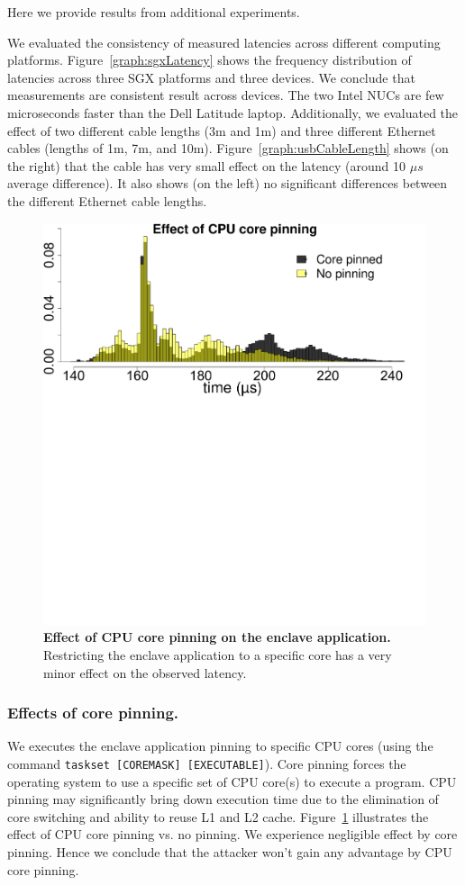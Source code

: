 Here we provide results from additional experiments.

We evaluated the consistency of measured latencies across different computing platforms. Figure~\ref{graph:sgxLatency} shows the frequency distribution of latencies across three SGX platforms and three \device devices. We conclude that measurements are consistent result across devices. The two Intel NUCs are few microseconds faster than the Dell Latitude laptop. Additionally, we evaluated the effect of two different \usb cable lengths (3m and 1m) and three different Ethernet cables (lengths of 1m, 7m, and 10m). Figure~\ref{graph:usbCableLength} shows (on the right) that the \usb cable has very small effect on the latency (around 10 $\mu s$ average difference). It also shows (on the left) no significant differences between the different Ethernet cable lengths. 


\begin{figure}[t]
  \centering
    \includegraphics[trim={0 18cm 1.8cm 0}, clip, width=0.75\linewidth]{chapters/ProximiTEE/data/CPU_stress/plot_pin_1.pdf}
    \caption{\textbf{Effect of CPU core pinning on the enclave application.} Restricting the enclave application to a specific core has a very minor effect on the observed latency.}

    \label{graph:cpuPin}
\end{figure}

\subsubsection{Effects of core pinning.} We executes the \name enclave application pinning to specific CPU cores (using the command \texttt{taskset [COREMASK] [EXECUTABLE]}). Core pinning forces the operating system to use a specific set of CPU core(s) to execute a program. CPU pinning may significantly bring down execution time due to the elimination of core switching and ability to reuse L1 and L2 cache. Figure~\ref{graph:cpuPin} illustrates the effect of CPU core pinning vs. no pinning. We experience negligible effect by core pinning. Hence we conclude that the attacker won't gain any advantage by CPU core pinning.

